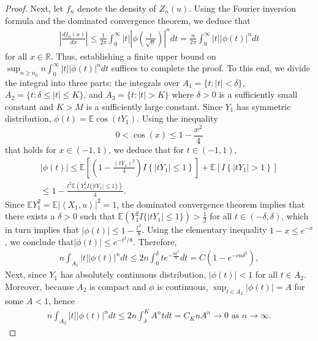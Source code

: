 \documentclass[12pt]{article}
\def\l{\left}
\def\r{\right}
\newcommand{\mb}{\mathbb}
\newcommand{\dotp}[2]{\left\langle#1,#2\right\rangle}
\theoremstyle{thmstyletwo}%
\theoremstyle{thmstylethree}%
\begin{document}
\begin{proof}
    Next, let $f_n$ denote the density of $Z_n(u)$. Using the Fourier inversion formula and the dominated convergence theorem, we deduce that
    \begin{align*}
        \l\lvert \frac{d f_n(x)}{dx}\r\rvert \leq \frac{1}{2\pi}\int_0^\infty \lvert t\rvert \l\lvert \phi\l(\frac{t}{\sqrt{n}}\r) \r\rvert^n dt = \frac{n}{2\pi} \int_0^\infty |t| \l\lvert \phi\l(t\r) \r\rvert^n dt
    \end{align*}
    for all $x \in \mb R$. Thus, establishing a finite upper bound on $\sup_{n \geq n_0}n \int_0^\infty |t| \l\lvert \phi\l(t\r) \r\rvert^n dt$ suffices to complete the proof. To this end, we divide the integral into three parts: the integrals over $A_1 = \{t: \lvert t\rvert < \delta\}$, $A_2 = \{t: \delta \leq \lvert t\rvert \leq K\}$, and $A_3 = \{t : \lvert t\rvert > K\}$ where $\delta > 0$ is a sufficiently small constant and $K > M$ is a sufficiently large constant. Since $Y_1$ has symmetric distribution, $\phi(t) = \mb E \cos(tY_1)$. Using the inequality 
    \[
    0 < \cos(x) \leq 1 - \frac{x^2}{4} 
    \]
    that holds for $x \in (-1, 1)$, we deduce that for $t \in (-1, 1)$,
    \begin{multline*}
        \lvert\phi(t) \rvert \leq \mb E\l[\l(1 - \frac{(tY_1)^2}{4} \r)I\l\{\lvert tY_1\rvert \leq 1\r\} \r] + \mb E\l[I\l\{\lvert tY_1\rvert > 1\r\}\r] \\
        \leq 1 - \frac{t^2 \mb E\l(Y_1^2 I\{\lvert tY_1\rvert \leq 1\}\r)}{4}.
    \end{multline*}
    Since $\mb E Y_1^2 = \mb E \l\lvert \dotp{X_1}{u} \r\rvert^2 = 1$, the dominated convergence theorem implies that there exists a $\delta > 0$ such that $\mb E\l(Y_1^2 I\{\lvert tY_1\rvert \leq 1\}\r) > \frac{1}{2}$ for all $t \in (-\delta, \delta)$, which in turn implies that $\lvert\phi(t) \rvert \leq 1 - \frac{t^2}{8}$. Using the elementary inequality $1 - x \leq e^{-x}$, we conclude that$\lvert\phi(t) \rvert \leq e^{-t^2/8}$. Therefore,
    \begin{align*}
        n \int_{A_1} |t| \l\lvert \phi\l(t\r) \r\rvert^n dt \leq 2n \int_0^\delta  t e^{-\frac{nt^2}{8}} dt = C \l(1 - e^{-cn\delta^2}\r),
    \end{align*}
    Next, since $Y_1$ has absolutely continuous distribution, $\lvert \phi(t) \rvert < 1$ for all $t \in A_2$. Moreover, because $A_2$ is compact and $\phi$ is continuous, $\sup_{t \in A_2} \lvert \phi(t) \rvert = A$ for some $A < 1$, hence
    \begin{align*}
        n \int_{A_2} |t| \l\lvert \phi\l(t\r) \r\rvert^n dt \leq 2n \int_{\delta}^K A^n t dt = C_K n A^n \to 0 \text{ as } n\to\infty.

\end{align*}
\end{proof}
\end{document}
